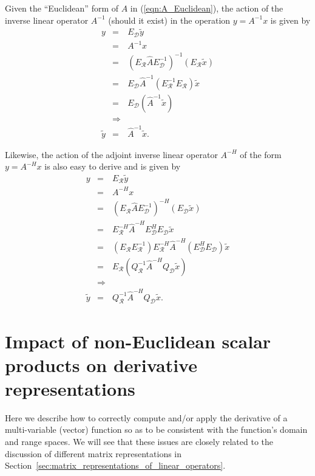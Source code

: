 \documentclass[pdf,ps2pdf,11pt]{SANDreport}
\begin{document}
Given the ``Euclidean'' form of $A$ in (\ref{eqn:A_Euclidean}), the action of
the inverse linear operator $A^{-1}$ (should it exist) in the operation $y =
A^{-1} x$ is given by
%
\begin{eqnarray}
y
& = & E_{\mathcal{D}} \tilde{y} \nonumber \\
& = & A^{-1} x \nonumber \\
& = & (E_{\mathcal{R}} \hat{A} E_{\mathcal{D}}^{-1})^{-1} (E_{\mathcal{R}} \tilde{x}) \nonumber \\
& = & E_{\mathcal{D}} \hat{A}^{-1} (E_{\mathcal{R}}^{-1} E_{\mathcal{R}}) \tilde{x}  \nonumber \\
& = & E_{\mathcal{D}} ( \hat{A}^{-1} \tilde{x} ) \nonumber \\
& \Rightarrow &  \nonumber \\
\tilde{y} & = & \hat{A}^{-1} \tilde{x}.
\label{eqn:A_Euclidean_matrix_inverse_apply}
\end{eqnarray}
%

Likewise, the action of the adjoint inverse linear operator $A^{-H}$ of the
form $y = A^{-H} x$ is also easy to derive and is given by
%
\begin{eqnarray}
y
& = & E_{\mathcal{R}} \tilde{y} \nonumber \\
& = & A^{-H} x \nonumber \\
& = & (E_{\mathcal{R}} \hat{A} E_{\mathcal{D}}^{-1})^{-H} (E_{\mathcal{D}} \tilde{x}) \nonumber \\
& = & E_{\mathcal{R}}^{-H} \hat{A}^{-H} E_{\mathcal{D}}^H E_{\mathcal{D}} \tilde{x}  \nonumber \\
& = & ( E_{\mathcal{R}} E_{\mathcal{R}}^{-1} ) E_{\mathcal{R}}^{-H} \hat{A}^{-H} ( E_{\mathcal{D}}^H E_{\mathcal{D}} ) \tilde{x}  \nonumber \\
& = & E_{\mathcal{R}} ( Q_{\mathcal{R}}^{-1} \hat{A}^{-H} Q_{\mathcal{D}} \tilde{x} ) \nonumber \\
& \Rightarrow &  \nonumber \\
\tilde{y} & = & Q_{\mathcal{R}}^{-1} \hat{A}^{-H} Q_{\mathcal{D}} \tilde{x}.
\label{eqn:A_Euclidean_matrix_adjoint_inverse_apply}
\end{eqnarray}
%

\section{Impact of non-Euclidean scalar products on derivative representations}

Here we describe how to correctly compute and/or apply the derivative of a
multi-variable (vector) function so as to be consistent with the function's
domain and range spaces.  We will see that these issues are closely related to
the discussion of different matrix representations in
Section~\ref{sec:matrix_representations_of_linear_operators}.
\end{document}
